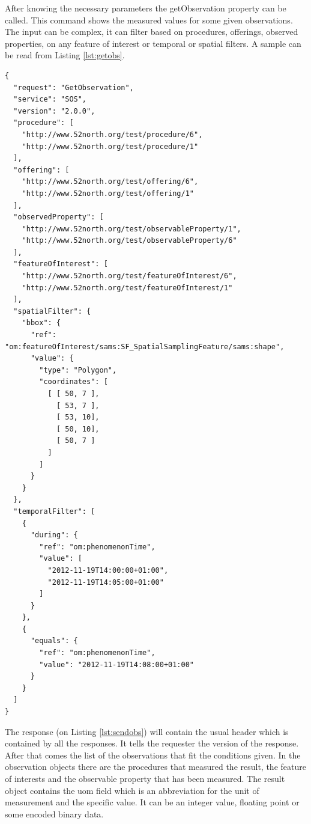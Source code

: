 After knowing the necessary parameters the getObservation property can be called. This command shows the measured values for some given observations. The input can be complex, it can filter based on procedures, offerings, observed properties, on any feature of interest or temporal or spatial filters. A sample can be read from Listing \ref{lst:getobs}.

\begin{lstlisting}[caption={JSON GetObservation POST request with all filters\label{lst:getobs}}]
{
  "request": "GetObservation",
  "service": "SOS",
  "version": "2.0.0",
  "procedure": [
    "http://www.52north.org/test/procedure/6",
    "http://www.52north.org/test/procedure/1"
  ],
  "offering": [
    "http://www.52north.org/test/offering/6",
    "http://www.52north.org/test/offering/1"
  ],
  "observedProperty": [
    "http://www.52north.org/test/observableProperty/1",
    "http://www.52north.org/test/observableProperty/6"
  ],
  "featureOfInterest": [
    "http://www.52north.org/test/featureOfInterest/6",
    "http://www.52north.org/test/featureOfInterest/1"
  ],
  "spatialFilter": {
    "bbox": {
      "ref": "om:featureOfInterest/sams:SF_SpatialSamplingFeature/sams:shape",
      "value": {
        "type": "Polygon",
        "coordinates": [
          [ [ 50, 7 ],
            [ 53, 7 ],
            [ 53, 10],
            [ 50, 10],
            [ 50, 7 ]
          ]
        ]
      }
    }
  },
  "temporalFilter": [
    {
      "during": {
        "ref": "om:phenomenonTime",
        "value": [
          "2012-11-19T14:00:00+01:00",
          "2012-11-19T14:05:00+01:00"
        ]
      }
    },
    { 
      "equals": {
        "ref": "om:phenomenonTime",
        "value": "2012-11-19T14:08:00+01:00"
      }
    }
  ]
}
\end{lstlisting}

The response (on Listing \ref{lst:sendobs}) will contain the usual header which is contained by all the responses. It tells the requester the version of the response. After that comes the list of the observations that fit the conditions given. In the observation objects there are the procedures that measured the result, the feature of interests and the observable property that has been measured. The result object contains the uom field which is an abbreviation for the unit of measurement and the specific value. It can be an integer value, floating point or some encoded binary data.

